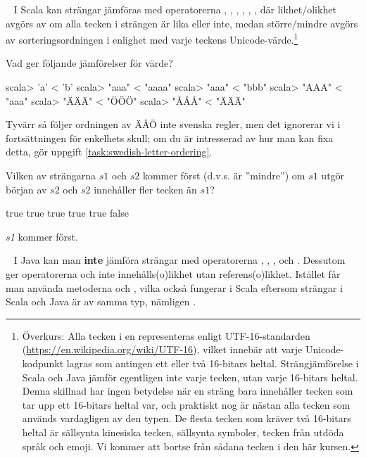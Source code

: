 \Task \label{task:string-order-operators} \what~  I Scala kan strängar jämföras med operatorerna \code{==}, \code{!=}, \code{<}, \code{<=}, \code{>}, \code{>=},  där likhet/olikhet avgörs av om alla tecken i strängen är lika eller inte, medan större/mindre avgörs av sorteringsordningen i enlighet med varje teckens Unicode-värde.\footnote{Överkurs: Alla tecken i en  representeras enligt UTF-16-standarden (\href{https://en.wikipedia.org/wiki/UTF-16}{https://en.wikipedia.org/wiki/UTF-16}), vilket innebär att varje Unicode-kodpunkt  lagras som antingen ett eller två 16-bitars heltal. Strängjämförelse i Scala och Java jämför egentligen inte varje tecken, utan varje 16-bitars heltal. Denna skillnad har ingen betydelse när en sträng bara innehåller tecken som tar upp ett 16-bitars heltal var, och praktiskt nog är nästan alla tecken som används vardagligen av den typen. De flesta tecken som kräver två 16-bitars heltal är sällsynta kinesiska tecken, sällsynta symboler, tecken från utdöda språk och emoji. Vi kommer att bortse från sådana tecken i den här kursen.}

\Subtask Vad ger följande jämförelser för värde?
\begin{REPL}
scala> 'a' < 'b'
scala> "aaa" < "aaaa"
scala> "aaa" < "bbb"
scala> "AAA" < "aaa"
scala> "ÄÄÄ" < "ÖÖÖ"
scala> "ÅÅÅ" < "ÄÄÄ"
\end{REPL}
Tyvärr så följer ordningen av ÄÅÖ inte svenska regler, men det ignorerar vi i fortsättningen för enkelhets skull; om du är intresserad av hur man kan fixa  detta, gör uppgift \ref{task:swedish-letter-ordering}.

\Subtask\Pen Vilken av strängarna $s1$ och $s2$ kommer först (d.v.s. är ''mindre'') om $s1$ utgör början av $s2$ och $s2$ innehåller fler tecken än $s1$?


\SOLUTION


\TaskSolved \what


\SubtaskSolved
\begin{REPL}
true
true
true
true
true
false
\end{REPL}

\SubtaskSolved
\emph{s1} kommer först.


\QUESTEND






\QUESTBEGIN

\Task  \what~  I Java kan man \textbf{inte} jämföra strängar med operatorerna \code{<}, \code{<=}, \code{>}, och \code{>=}. Dessutom ger operatorerna \code{==} och \code{!=} inte innehålls(o)likhet utan referens(o)likhet. Istället får man använda metoderna  och , vilka också fungerar i Scala eftersom strängar i Scala och Java är av samma typ, nämligen .



